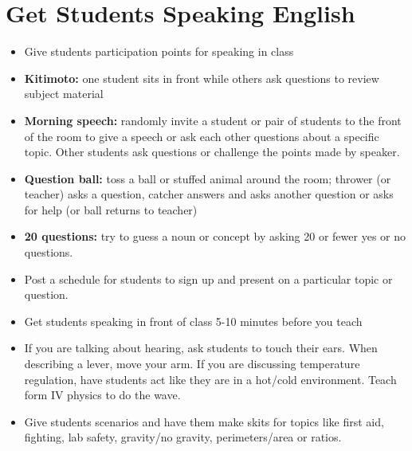 \section{Get Students Speaking English}
\begin{itemize}
\item Give students participation points for speaking in class 
\item \textbf{Kitimoto:} one student sits in front while others ask questions
to review subject material 
\item \textbf{Morning speech:} randomly invite a student or pair of students
to the front of the room to give a speech or ask each other questions
about a specific topic. Other students ask questions or challenge
the points made by speaker. 
\item \textbf{Question ball:} toss a ball or stuffed animal around the room;
thrower (or teacher) asks a question, catcher answers and asks another
question or asks for help (or ball returns to teacher) 
\item \textbf{20 questions:} try to guess a noun or concept by asking 20
or fewer yes or no questions. 
\item Post a schedule for students to sign up and present on a particular
topic or question.  
\item Get students speaking in front of class 5-10 minutes before you teach 
\item If you are talking about hearing, ask students to touch their ears.
When describing a lever, move your arm. If you are discussing temperature
regulation, have students act like they are in a hot/cold environment.
Teach form IV physics to do the wave.
\item Give students scenarios and have them make skits for topics like first
aid, fighting, lab safety, gravity/no gravity, perimeters/area or
ratios. 
\end{itemize}

